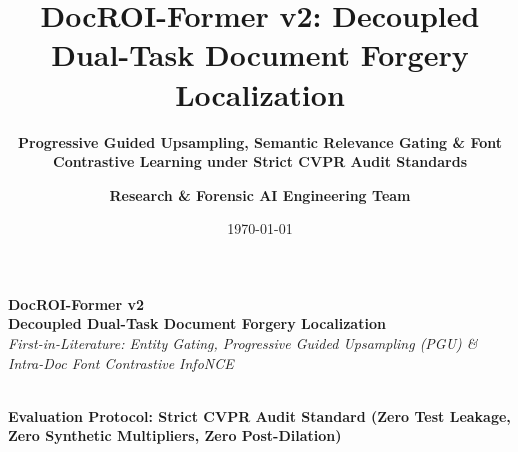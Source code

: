 \documentclass[aspectratio=169, 10pt]{beamer}
\title[\textbf{DocROI-Former v2}]{\textbf{\LARGE DocROI-Former v2: Decoupled Dual-Task Document Forgery Localization}}
\subtitle{\textbf{\normalsize Progressive Guided Upsampling, Semantic Relevance Gating \& Font Contrastive Learning under Strict CVPR Audit Standards}}
\author{\textbf{Research \& Forensic AI Engineering Team}}
\institute{\textbf{Deep Document Forensics \& Visual Security Lab}}
\date{\today}
\begin{document}
\begin{frame}[plain]
  \vfill
  \centering
  \begin{tcolorbox}[colback=primaryDark, colframe=primaryAccent, arc=3mm, boxrule=1.5pt, width=0.96\paperwidth]
    \centering\vspace{2mm}
    {\color{primaryAccent}\Huge\textbf{DocROI-Former v2}}\\[3mm]
    {\color{white}\Large\textbf{Decoupled Dual-Task Document Forgery Localization}}\\[2mm]
    {\color{white}\footnotesize\textit{First-in-Literature: Entity Gating, Progressive Guided Upsampling (PGU) \& Intra-Doc Font Contrastive InfoNCE}}\\[4mm]
    \\[2mm]
    {\color{white}\scriptsize\textbf{Evaluation Protocol: Strict CVPR Audit Standard (Zero Test Leakage, Zero Synthetic Multipliers, Zero Post-Dilation)}}
    \vspace{2mm}
  \end{tcolorbox}
  \vfill
\end{frame}
\end{document}
